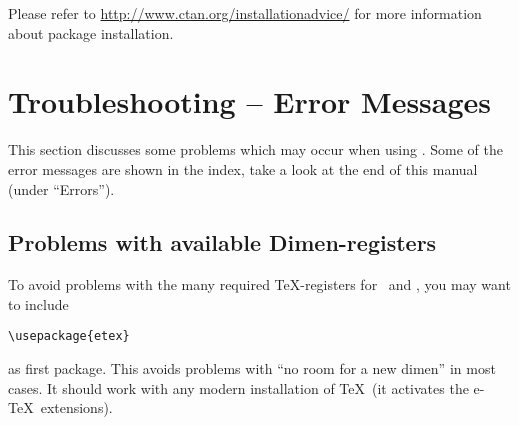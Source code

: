 Please refer to \url{http://www.ctan.org/installationadvice/} for more information about package installation.



\section{Troubleshooting -- Error Messages}
This section discusses some problems which may occur when using \PGFPlots.
Some of the error messages are shown in the index, take a look at the end of this manual (under ``Errors'').


\subsection{Problems with available Dimen-registers}
To avoid problems with the many required \TeX-registers for \PGF\ and \PGFPlots, you may want to include
\begin{verbatim}
\usepackage{etex}
\end{verbatim}
as first package. This avoids problems with ``no room for a new dimen''
%
in most cases. It should work with any modern installation of \TeX\ (it activates the e-\TeX\ extensions).

